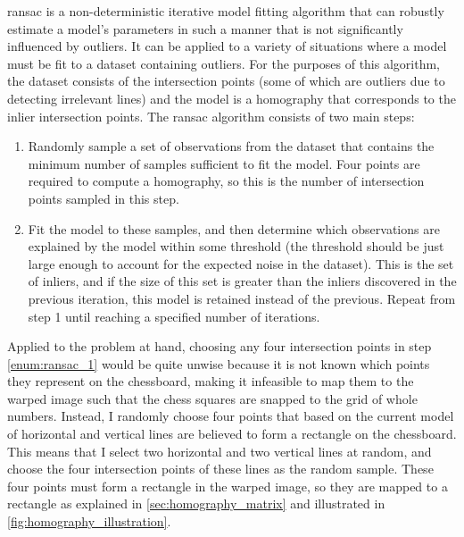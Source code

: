 \documentclass[../report.tex]{subfiles}
\begin{document}
\Gls{ransac} \cite{fischler1981} is a non-deterministic iterative model fitting algorithm that can robustly estimate a model's parameters in such a manner that is not significantly influenced by outliers.
It can be applied to a variety of situations where a model must be fit to a dataset containing outliers.
For the purposes of this algorithm, the dataset consists of the intersection points (some of which are outliers due to detecting irrelevant lines) and the model is a homography that corresponds to the inlier intersection points.
The \gls{ransac} algorithm consists of two main steps:
\begin{enumerate}
    \item \label{enum:ransac_1}
        Randomly sample a set of observations from the dataset that contains the minimum number of samples sufficient to fit the model. 
        Four points are required to compute a homography, so this is the number of intersection points sampled in this step.
    \item \label{enum:ransac_2}
        Fit the model to these samples, and then determine which observations are explained by the model within some threshold (the threshold should be just large enough to account for the expected noise in the dataset). 
        This is the set of inliers, and if the size of this set is greater than the inliers discovered in the previous iteration, this model is retained instead of the previous.
        Repeat from step 1 until reaching a specified number of iterations.
\end{enumerate}

Applied to the problem at hand, choosing any four intersection points in step \ref{enum:ransac_1} would be quite unwise because it is not known which points they represent on the chessboard, making it infeasible to map them to the warped image such that the chess squares are snapped to the grid of whole numbers.
Instead, I randomly choose four points that based on the current model of horizontal and vertical lines are believed to form a rectangle on the chessboard.
This means that I select two horizontal and two vertical lines at random, and choose the four intersection points of these lines as the random sample.
These four points must form a rectangle in the warped image, so they are mapped to a rectangle as explained in \cref{sec:homography_matrix} and illustrated in \cref{fig:homography_illustration}.
\end{document}
